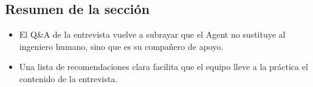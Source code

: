 \subsection{Resumen de la sección}
\begin{itemize}
    \item El Q\&A de la entrevista vuelve a subrayar que el Agent no sustituye al ingeniero humano, sino que es su compañero de apoyo.
    \item Una lista de recomendaciones clara facilita que el equipo lleve a la práctica el contenido de la entrevista.
\end{itemize}

